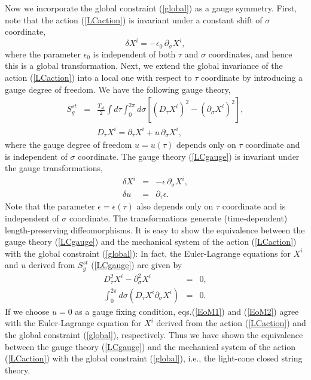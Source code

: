 \documentclass[12pt,a4paper]{article}
\newcommand{\ptau}{\partial_\tau}
\newcommand{\psig}{\partial_\sigma}
\begin{document}
Now we incorporate the global constraint (\ref{global}) as a  gauge
symmetry. First, note that the action (\ref{LCaction}) is invariant
under a constant shift of $\sigma$ coordinate,
\begin{equation}
  \delta X^i=-\epsilon_0\,\psig X^i,
\end{equation}
where the parameter $\epsilon_0$ is independent of both $\tau$ and
$\sigma$ coordinates, and hence this is a global transformation.
Next, we extend the global invariance of the action (\ref{LCaction})
into a local one with respect to $\tau$ coordinate by introducing a
gauge degree of freedom. We have the following gauge theory,
\begin{eqnarray}
  S_g^{st}&=&\frac{T_{st}}{2}\int d\tau \int_0^{2\pi}d\sigma\left[
     (D_{\tau} X^i)^2-(\psig X^i)^2\right],\label{LCgauge}\\
  &&D_{\tau}X^i=\ptau X^i +u\,\psig X^i,\nonumber
\end{eqnarray}
where the gauge degree of freedom $u=u(\tau)$ depends only on $\tau$
coordinate and is independent of $\sigma$ coordinate. The gauge theory
(\ref{LCgauge}) is invariant under the gauge transformations,
\begin{eqnarray}
  \delta X^i&=&-\epsilon\,\psig X^i,\label{gtrans1}\\
  \delta u &=&\ptau\epsilon.\label{gtrans2}
\end{eqnarray}
Note that the parameter $\epsilon=\epsilon(\tau)$ also depends only on
$\tau$ coordinate and is independent of $\sigma$ coordinate.
The transformations generate (time-dependent) length-preserving
diffeomorphisms.
It is easy to show the equivalence between the gauge theory
(\ref{LCgauge}) and the mechanical system of the action (\ref{LCaction})
with the global constraint (\ref{global}): In fact, the Euler-Lagrange
equations for $X^i$ and $u$ derived from $S_g^{st}$ (\ref{LCgauge})
are given by
\begin{eqnarray}
  D_{\tau}^2X^i-\psig^2 X^i&=&0,\label{EoM1}\\
  \int_0^{2\pi}d\sigma (D_{\tau}X^i\psig X^i)&=&0\label{EoM2}.
\end{eqnarray}
If we choose $u=0$ as a gauge fixing condition, eqs.(\ref{EoM1}) and
(\ref{EoM2}) agree with the Euler-Lagrange equation for $X^i$ derived
from the action (\ref{LCaction}) and the global constraint
(\ref{global}), respectively.
Thus we have shown the equivalence between the gauge theory
(\ref{LCgauge}) and the mechanical system of the action
(\ref{LCaction}) with the global constraint (\ref{global}), i.e.,
the light-cone closed string theory.
\end{document}
